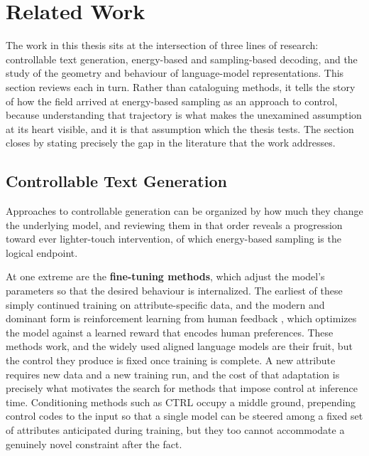 \section{Related Work}
\label{ch:related}

The work in this thesis sits at the intersection of three lines of research: controllable text generation, energy-based and sampling-based decoding, and the study of the geometry and behaviour of language-model representations. This section reviews each in turn. Rather than cataloguing methods, it tells the story of how the field arrived at energy-based sampling as an approach to control, because understanding that trajectory is what makes the unexamined assumption at its heart visible, and it is that assumption which the thesis tests. The section closes by stating precisely the gap in the literature that the work addresses.

\subsection{Controllable Text Generation}
\label{sec:rel-ctg}

Approaches to controllable generation can be organized by how much they change the underlying model, and reviewing them in that order reveals a progression toward ever lighter-touch intervention, of which energy-based sampling is the logical endpoint.

At one extreme are the \textbf{fine-tuning methods}, which adjust the model's parameters so that the desired behaviour is internalized. The earliest of these simply continued training on attribute-specific data, and the modern and dominant form is reinforcement learning from human feedback \citep{ouyang2022training}, which optimizes the model against a learned reward that encodes human preferences. These methods work, and the widely used aligned language models are their fruit, but the control they produce is fixed once training is complete. A new attribute requires new data and a new training run, and the cost of that adaptation is precisely what motivates the search for methods that impose control at inference time. Conditioning methods such as CTRL \citep{keskar2019ctrl} occupy a middle ground, prepending control codes to the input so that a single model can be steered among a fixed set of attributes anticipated during training, but they too cannot accommodate a genuinely novel constraint after the fact.

